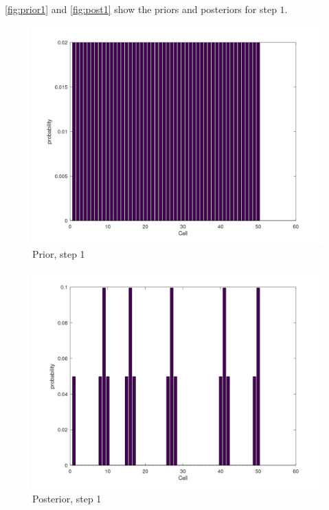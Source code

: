 \documentclass[11pt]{article}
\begin{document}
        \autoref{fig:prior1} and \autoref{fig:post1} show the priors and posteriors for step $1$.
        \begin{figure}[H]
            \centering
            \includegraphics[width=1.0\textwidth]{../images/prior1v2}
            \caption{Prior, step 1}
            \label{fig:prior1}
        \end{figure}
        \begin{figure}[H]
            \centering
            \includegraphics[width=1.0\textwidth]{../images/posterior1v2}
            \caption{Posterior, step 1}
            \label{fig:post1}
        \end{figure}
\end{document}
